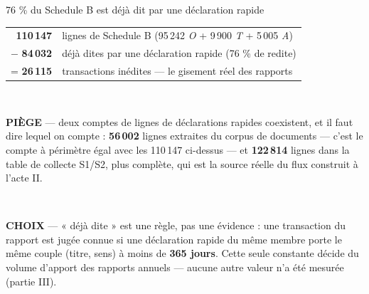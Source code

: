 \documentclass[11pt,aspectratio=169]{beamer}
\newcommand{\defl}[1]{{\scriptsize\color{black!55}#1}}
\newcommand{\choixbox}[1]{%
  \colorbox{alertred!8}{\parbox{\dimexpr\linewidth-8pt}{\scriptsize
    \textbf{\textcolor{alertred}{CHOIX}}\; --- #1}}}
\newcommand{\piege}[1]{%
  \colorbox{warnorange!12}{\parbox{\dimexpr\linewidth-8pt}{\scriptsize
    \textbf{\textcolor{warnorange}{PIÈGE}}\; --- #1}}}
\begin{document}
\begin{frame}{76 \% du Schedule B est déjà dit par une déclaration rapide}
  \centering
  \vspace{2mm}
  \begin{tabular}{@{}rl@{}}
    \toprule
    \textbf{110\,147} & lignes de Schedule B \; \defl{(95\,242 \emph{O} + 9\,900 \emph{T} + 5\,005 \emph{A})}\\
    $-$ \textbf{84\,032} & déjà dites par une déclaration rapide \; \defl{(76 \% de redite)}\\
    \midrule
    = \textbf{26\,115} & transactions inédites --- le gisement réel des rapports\\
    \bottomrule
  \end{tabular}\\[4mm]
  \piege{deux comptes de lignes de déclarations rapides coexistent, et il faut dire lequel on
  compte : \textbf{56\,002} lignes extraites du corpus de documents --- c'est le compte à périmètre
  égal avec les 110\,147 ci-dessus --- et \textbf{122\,814} lignes dans la table de collecte
  S1/S2, plus complète, qui est la source réelle du flux construit à l'acte II.}\\[3mm]
  \choixbox{« déjà dite » est une règle, pas une évidence : une transaction du rapport est jugée
  connue si une déclaration rapide du même membre porte le même couple (titre, sens) à moins de
  \textbf{365 jours}. Cette seule constante décide du volume d'apport des rapports annuels ---
  aucune autre valeur n'a été mesurée (partie III).}
\end{frame}
\end{document}
